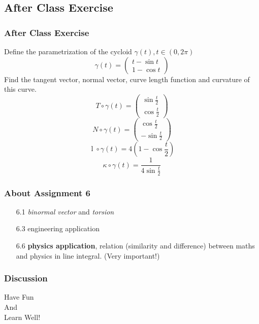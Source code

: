 \documentclass[12pt, t]{beamer}
\renewcommand{\emph}[1]{{\color{Turquoise3}\textsl{#1}}}
\begin{document}
\subsection{After Class Exercise}
\begin{frame}
    \frametitle{After Class Exercise}
    Define the parametrization of the cycloid $\gamma(t), t \in(0,2 \pi)$
    \[
        \gamma(t)=\left(\begin{array}{c}
                t-\sin t \\
                1-\cos t
            \end{array}\right)
    \]
    Find the tangent vector, normal vector, curve length function and curvature of this curve.
    $$T \circ \gamma(t)=\left(\begin{array}{c}
                \sin \frac{t}{2} \\
                \cos \frac{t}{2}
            \end{array}\right)        $$
    $$
        N \circ \gamma(t)=\left(\begin{array}{c}
                \cos \frac{t}{2} \\
                -\sin \frac{t}{2}
            \end{array}\right)        $$
    $$
        \operatorname{l}\circ \gamma(t)=4\left(1-\cos \frac{t}{2}\right)
    $$
    $$\kappa \circ \gamma(t)=\frac{1}{4 \sin \frac{t}{2}}
    $$

\end{frame}


\begin{frame}
    \frametitle{About Assignment 6}
    \begin{itemize}
        \item[6.1] \emph{binormal vector} and \emph{torsion}
        \item[6.3] engineering application 
        \item[6.6] \textbf{physics application}, relation (similarity and difference) between maths and physics in line integral. (Very important!) 
    \end{itemize}
    
\end{frame}

\begin{frame}
    \frametitle{Discussion}
    \vspace{1cm}
    \begin{center}
        \LARGE
        Have Fun\\
        And\\
        Learn Well!
    \end{center}
\end{frame}
\end{document}
